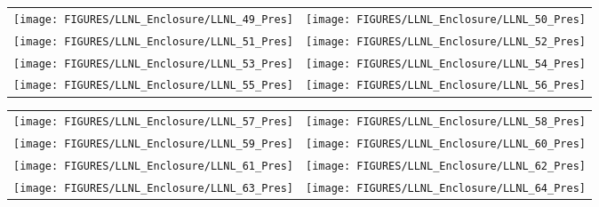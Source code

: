 \begin{figure}[p]
\begin{tabular*}{\textwidth}{l@{\extracolsep{\fill}}r}
\texttt{[image: FIGURES/LLNL\_Enclosure/LLNL\_49\_Pres]} &
\texttt{[image: FIGURES/LLNL\_Enclosure/LLNL\_50\_Pres]} \\
\texttt{[image: FIGURES/LLNL\_Enclosure/LLNL\_51\_Pres]} &
\texttt{[image: FIGURES/LLNL\_Enclosure/LLNL\_52\_Pres]} \\
\texttt{[image: FIGURES/LLNL\_Enclosure/LLNL\_53\_Pres]} &
\texttt{[image: FIGURES/LLNL\_Enclosure/LLNL\_54\_Pres]} \\
\texttt{[image: FIGURES/LLNL\_Enclosure/LLNL\_55\_Pres]} &
\texttt{[image: FIGURES/LLNL\_Enclosure/LLNL\_56\_Pres]}
\end{tabular*}
\label{LLNL_Enclosure_Pres_7}
\end{figure}

\begin{figure}[p]
\begin{tabular*}{\textwidth}{l@{\extracolsep{\fill}}r}
\texttt{[image: FIGURES/LLNL\_Enclosure/LLNL\_57\_Pres]} &
\texttt{[image: FIGURES/LLNL\_Enclosure/LLNL\_58\_Pres]} \\
\texttt{[image: FIGURES/LLNL\_Enclosure/LLNL\_59\_Pres]} &
\texttt{[image: FIGURES/LLNL\_Enclosure/LLNL\_60\_Pres]} \\
\texttt{[image: FIGURES/LLNL\_Enclosure/LLNL\_61\_Pres]} &
\texttt{[image: FIGURES/LLNL\_Enclosure/LLNL\_62\_Pres]} \\
\texttt{[image: FIGURES/LLNL\_Enclosure/LLNL\_63\_Pres]} &
\texttt{[image: FIGURES/LLNL\_Enclosure/LLNL\_64\_Pres]}
\end{tabular*}
\label{LLNL_Enclosure_Pres_8}
\end{figure}
